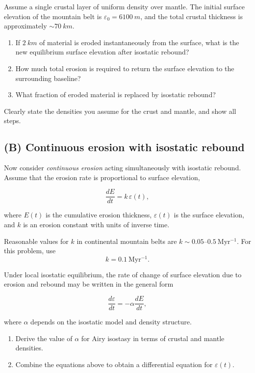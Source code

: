 \documentclass[11pt,a4paper,final]{article}
\begin{document}
Assume a single crustal layer of uniform density over mantle.
The initial surface elevation of the mountain belt is \(\varepsilon_0 = \SI{6100}{m}\),
and the total crustal thickness is approximately \(\sim \SI{70}{km}\).

\begin{enumerate}
    \item If \(\SI{2}{km}\) of material is eroded instantaneously from the surface,
    what is the new equilibrium surface elevation after isostatic rebound?
    \item How much total erosion is required to return the surface elevation to the
    surrounding baseline?
    \item What fraction of eroded material is replaced by isostatic rebound?
\end{enumerate}

Clearly state the densities you assume for the crust and mantle, and show all steps.

\subsection*{(B) Continuous erosion with isostatic rebound}

Now consider \emph{continuous erosion} acting simultaneously with isostatic rebound.
Assume that the erosion rate is proportional to surface elevation,

\[
\frac{dE}{dt} = k\,\varepsilon(t),
\]

where \(E(t)\) is the cumulative erosion thickness, \(\varepsilon(t)\) is the surface elevation,
and \(k\) is an erosion constant with units of inverse time.

Reasonable values for \(k\) in continental mountain belts are
\(k \sim 0.05\text{--}0.5~\mathrm{Myr^{-1}}\).
For this problem, use
\[
k = 0.1~\mathrm{Myr^{-1}}.
\]

\vspace{0.5em}

Under local isostatic equilibrium, the rate of change of surface elevation due to erosion
and rebound may be written in the general form

\[
\frac{d\varepsilon}{dt} = -\alpha \frac{dE}{dt},
\]

where \(\alpha\) depends on the isostatic model and density structure.

\begin{enumerate}
    \item Derive the value of \(\alpha\) for Airy isostasy in terms of crustal and mantle
    densities.
    \item Combine the equations above to obtain a differential equation for \(\varepsilon(t)\).
\end{enumerate}
\end{document}
